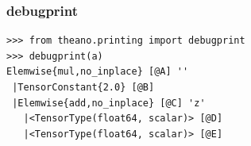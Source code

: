 \documentclass[utf8x,xcolor=pdftex,dvipsnames,table]{beamer}
\begin{document}
\begin{frame}[fragile]
  \frametitle{debugprint}

\begin{lstlisting}
>>> from theano.printing import debugprint
>>> debugprint(a)
Elemwise{mul,no_inplace} [@A] ''
 |TensorConstant{2.0} [@B]
 |Elemwise{add,no_inplace} [@C] 'z'
   |<TensorType(float64, scalar)> [@D]
   |<TensorType(float64, scalar)> [@E]
\end{lstlisting}
\end{frame}





\end{document}
